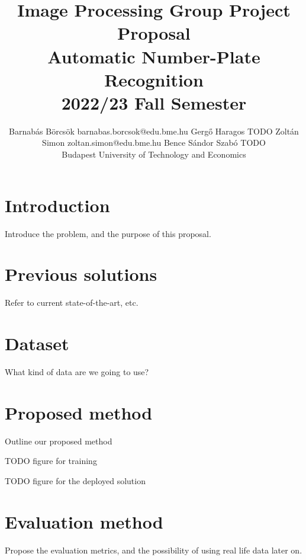 \documentclass[twoside,11pt]{article}
\begin{document}
\title{
    Image Processing Group Project Proposal\\
    Automatic Number-Plate Recognition\\
    2022/23 Fall Semester
}

\author{
    \name Barnabás Börcsök
    \email barnabas.borcsok@edu.bme.hu
    \AND
    \name Gergő Haragos
    \email TODO
   \AND
    \name Zoltán Simon
    \email zoltan.simon@edu.bme.hu
   \AND
    \name Bence Sándor Szabó 
    \email TODO
   \\\vfill\hfill\addr Budapest University of Technology and Economics
}

\maketitle

\section{Introduction}
Introduce the problem, and the purpose of this proposal.

\section{Previous solutions}
Refer to current state-of-the-art, etc.

\cite{survOnMet}
\cite{changShyLi}

\section{Dataset} 
What kind of data are we going to use?

\section{Proposed method}
Outline our proposed method

TODO figure for training

TODO figure for the deployed solution

\section{Evaluation method}
Propose the evaluation metrics, and the possibility of using real life data
later on.


\newpage

\newpage
\end{document}

